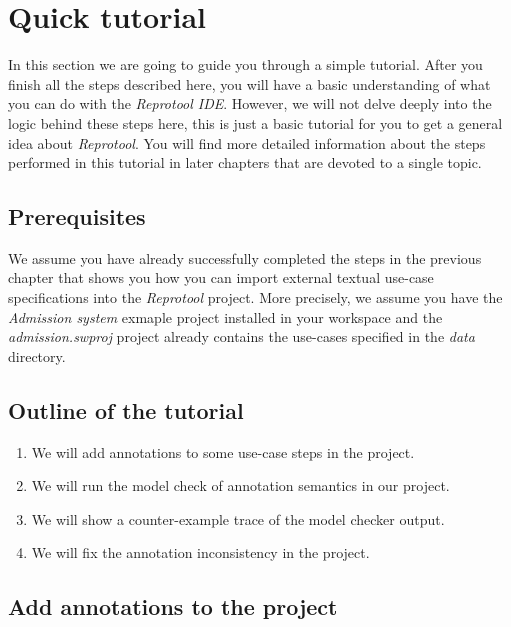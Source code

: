 \section{Quick tutorial}

In this section we are going to guide you through a simple tutorial. After you finish all the steps described here, you will have
a basic understanding of what you can do with the \emph{Reprotool IDE}. However, we will not delve deeply into the logic behind these
steps here, this is just a basic tutorial for you to get a general idea about \emph{Reprotool}. You will find more detailed information
about the steps performed in this tutorial in later chapters that are devoted to a single topic.

\subsection{Prerequisites}

We assume you have already successfully completed the steps in the previous chapter that shows you how you can import external textual
use-case specifications into the \emph{Reprotool} project. More precisely, we assume you have the \emph{Admission system} exmaple
project installed in your workspace and the \emph{admission.swproj} project already contains the use-cases specified in the \emph{data}
directory.

\subsection{Outline of the tutorial}
\begin{enumerate}
  \item We will add annotations to some use-case steps in the project.
  \item We will run the model check of annotation semantics in our project.
  \item We will show a counter-example trace of the model checker output.
  \item We will fix the annotation inconsistency in the project.
\end{enumerate}

\subsection{Add annotations to the project}

